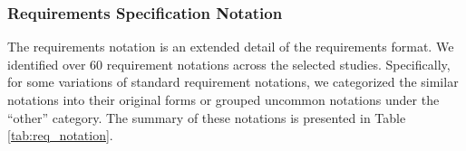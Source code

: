 \subsubsection{Requirements Specification Notation}





The requirements notation is an extended detail of the requirements format. We identified over 60 requirement notations across the selected studies. Specifically, for some variations of standard requirement notations, we categorized the similar notations into their original forms or grouped uncommon notations under the ``other'' category. The summary of these notations is presented in Table \ref{tab:req_notation}.

